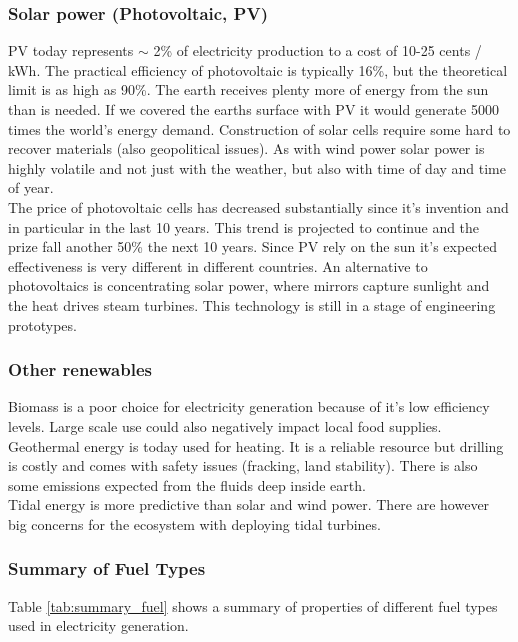 \subsubsection{Solar power (Photovoltaic, PV)}
PV today represents $\sim$ 2\% of electricity production to a cost of 10-25 cents / kWh.
The practical efficiency of photovoltaic is typically 16\%, but the theoretical limit is as high as 90\%.
The earth receives plenty more of energy from the sun than is needed. If we covered the earths surface with PV it would generate 5000 times the world's energy demand.
Construction of solar cells require some hard to recover materials (also geopolitical issues).
As with wind power solar power is highly volatile and not just with the weather, but also with time of day and time of year.\\

The price of photovoltaic cells has decreased substantially since it's invention and in particular in the last 10 years. This trend is projected to continue and the prize fall another 50\% the next 10 years.
Since PV rely on the sun it's expected effectiveness is very different in different countries.
An alternative to photovoltaics is concentrating solar power, where mirrors capture sunlight and the heat drives steam turbines. This technology is still in a stage of engineering prototypes.

\subsubsection{Other renewables}
Biomass is a poor choice for electricity generation because of it's low efficiency levels. Large scale use could also negatively impact local food supplies.\\

Geothermal energy is today used for heating.
It is a reliable resource but drilling is costly and comes with safety issues (fracking, land stability).
There is also some \cotwo emissions expected from the fluids deep inside earth.\\

Tidal energy is more predictive than solar and wind power. There are however big concerns for the ecosystem with deploying tidal turbines.

\subsubsection{Summary of Fuel Types}
Table \ref{tab:summary_fuel} shows a summary of properties of different fuel types used in electricity generation.

